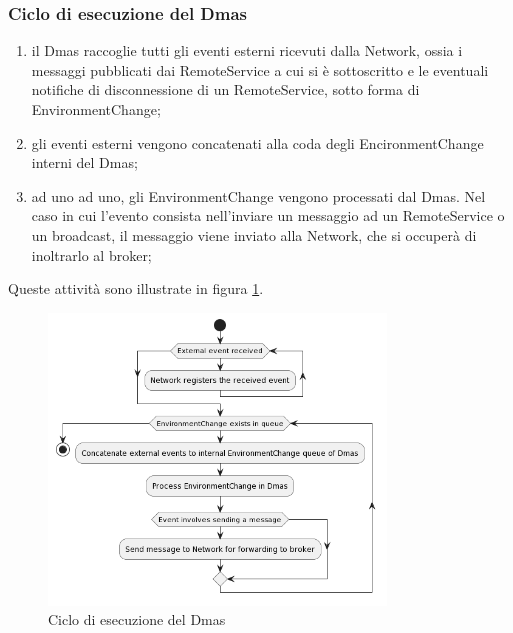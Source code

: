 \subsubsection{Ciclo di esecuzione del Dmas}

\begin{enumerate}
    \item il Dmas raccoglie tutti gli eventi esterni ricevuti dalla Network, ossia i messaggi pubblicati dai RemoteService a cui si è sottoscritto e le eventuali notifiche di disconnessione di un RemoteService, sotto forma di EnvironmentChange;
    \item gli eventi esterni vengono concatenati alla coda degli EncironmentChange interni del Dmas;
    \item ad uno ad uno, gli EnvironmentChange vengono processati dal Dmas. Nel caso in cui l'evento consista nell'inviare un messaggio ad un RemoteService o un broadcast, il messaggio viene inviato alla Network, che si occuperà di inoltrarlo al broker;
\end{enumerate}

Queste attività sono illustrate in figura \ref{fig:execution}.

\begin{figure}
    \centering
    \includegraphics[width=0.8\textwidth]{figures/activity-applychanges.png}
    \caption{Ciclo di esecuzione del Dmas}
    \label{fig:execution}
\end{figure}

